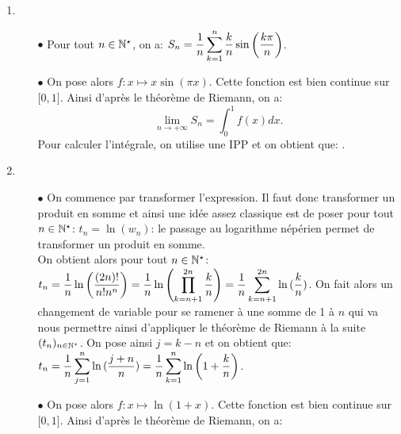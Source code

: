 \documentclass[a4paper, 11pt,reqno]{article}
\begin{document}
\begin{correction}
\begin{enumerate}
\begin{itemize}
			            Pour calculer l'int\'egrale, on reconna\^{i}t une primitive usuelle et ainsi on obtient que: $\lim\limits_{n\to +\infty} T_n=\ddp\frac{2}{3}(\sqrt{2}-1)$.
			      \item[$\bullet$] Comme pour tout $n\in\N^{\star}$: $S_n=\ddp\frac{T_n}{\sqrt{n}}$, on a par propri\'et\'e sur le quotient de limite que: .
		      \end{itemize}
		\item
		      \begin{itemize}
			      \item[$\bullet$] Pour tout $n\in\N^{\star}$, on a: $S_n=\displaystyle\frac{1}{n}\sum\limits_{k=1}^n \displaystyle\frac{k}{n} \sin{\left( \displaystyle\frac{k\pi}{n} \right)}$.
			      \item[$\bullet$] On pose alors $f: x\mapsto x\sin{(\pi x)}$. Cette fonction est bien continue sur $\lbrack 0,1\rbrack$. Ainsi d'apr\`{e}s le th\'eor\`{e}me de Riemann, on a:
			            $$\lim\limits_{n\to +\infty} S_n=\int_0^1 f(x)dx.$$
			            Pour calculer l'int\'egrale, on utilise une IPP et on obtient que: .
		      \end{itemize}
		\item
		      \begin{itemize}
			      \item[$\bullet$] On commence par transformer l'expression. Il faut donc transformer un produit en somme et ainsi une id\'ee assez classique est de poser pour tout $n\in\N^{\star}$: $t_n=\ln{(w_n)}$: le passage au logarithme n\'ep\'erien permet de transformer un produit en somme.\\
			            \noindent On obtient alors pour tout $n\in\N^{\star}$: $t_n=\displaystyle\frac{1}{n} \ln{\left(  \displaystyle\frac{(2n)!}{ n! n^n} \right)}=
				            \displaystyle\frac{1}{n} \ln{\left( \prod_{k=n+1}^{2n} \displaystyle\frac{k}{n} \right)}=\displaystyle\frac{1}{n}  \displaystyle\sum\limits_{k=n+1}^{2n} \ln{(\displaystyle\frac{k}{n})}$. On fait alors un changement de variable pour se ramener \`{a} une somme de 1 \`{a} $n$ qui va nous permettre ainsi d'appliquer le th\'eor\`{e}me de Riemann \`{a} la suite $(t_n)_{n\in\mathbb{N}^{\star}}$. On pose ainsi $j=k-n$ et on obtient que: $t_n=\displaystyle\frac{1}{n}  \displaystyle\sum\limits_{j=1}^{n} \ln{(\displaystyle\frac{j+n}{n})}=\displaystyle\frac{1}{n}  \displaystyle\sum\limits_{k=1}^{n} \ln{\left(1+\displaystyle\frac{k}{n} \right)}$.
			      \item[$\bullet$] On pose alors $f: x\mapsto \ln{\left(  1+x\right)}$. Cette fonction est bien continue sur $\lbrack 0,1\rbrack$. Ainsi d'apr\`{e}s le th\'eor\`{e}me de Riemann, on a:

\end{itemize}
\end{enumerate}
\end{correction}
\end{document}
